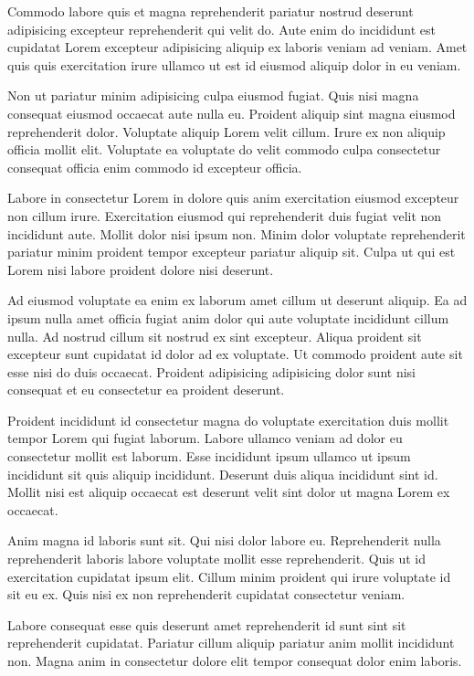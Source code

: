 \documentclass[
    12pt,
    letterpaper,
    oneside,
    noraggedright
]{turabian-researchpaper}
\begin{document}
Commodo labore quis et magna reprehenderit pariatur nostrud deserunt
adipisicing excepteur reprehenderit qui velit do. Aute enim do
incididunt est cupidatat Lorem excepteur adipisicing aliquip ex laboris
veniam ad veniam. Amet quis quis exercitation irure ullamco ut est id
eiusmod aliquip dolor in eu veniam.

Non ut pariatur minim adipisicing culpa eiusmod fugiat. Quis nisi magna
consequat eiusmod occaecat aute nulla eu. Proident aliquip sint magna
eiusmod reprehenderit dolor. Voluptate aliquip Lorem velit cillum. Irure
ex non aliquip officia mollit elit. Voluptate ea voluptate do velit
commodo culpa consectetur consequat officia enim commodo id excepteur
officia.

Labore in consectetur Lorem in dolore quis anim exercitation eiusmod
excepteur non cillum irure. Exercitation eiusmod qui reprehenderit duis
fugiat velit non incididunt aute. Mollit dolor nisi ipsum non. Minim
dolor voluptate reprehenderit pariatur minim proident tempor excepteur
pariatur aliquip sit. Culpa ut qui est Lorem nisi labore proident dolore
nisi deserunt.

Ad eiusmod voluptate ea enim ex laborum amet cillum ut deserunt aliquip.
Ea ad ipsum nulla amet officia fugiat anim dolor qui aute voluptate
incididunt cillum nulla. Ad nostrud cillum sit nostrud ex sint
excepteur. Aliqua proident sit excepteur sunt cupidatat id dolor ad ex
voluptate. Ut commodo proident aute sit esse nisi do duis occaecat.
Proident adipisicing adipisicing dolor sunt nisi consequat et eu
consectetur ea proident deserunt.

Proident incididunt id consectetur magna do voluptate exercitation duis
mollit tempor Lorem qui fugiat laborum. Labore ullamco veniam ad dolor
eu consectetur mollit est laborum. Esse incididunt ipsum ullamco ut
ipsum incididunt sit quis aliquip incididunt. Deserunt duis aliqua
incididunt sint id. Mollit nisi est aliquip occaecat est deserunt velit
sint dolor ut magna Lorem ex occaecat.

Anim magna id laboris sunt sit. Qui nisi dolor labore eu. Reprehenderit
nulla reprehenderit laboris labore voluptate mollit esse reprehenderit.
Quis ut id exercitation cupidatat ipsum elit. Cillum minim proident qui
irure voluptate id sit eu ex. Quis nisi ex non reprehenderit cupidatat
consectetur veniam.

Labore consequat esse quis deserunt amet reprehenderit id sunt sint sit
reprehenderit cupidatat. Pariatur cillum aliquip pariatur anim mollit
incididunt non. Magna anim in consectetur dolore elit tempor consequat
dolor enim laboris.
\end{document}
